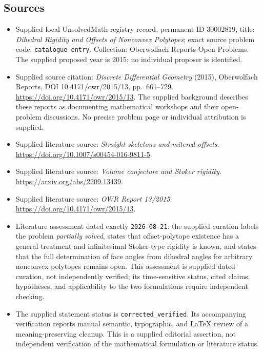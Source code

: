 \documentclass[11pt]{article}
\begin{document}
\subsection{Sources}
\begin{itemize}
\item Supplied local UnsolvedMath registry record, permanent ID \(30002819\), title: \emph{Dihedral Rigidity and Offsets of Nonconvex Polytopes}; exact source problem code: \texttt{catalogue entry}. Collection: Oberwolfach Reports Open Problems. The supplied proposed year is 2015; no individual proposer is identified.
\item Supplied source citation: \emph{Discrete Differential Geometry} (2015), Oberwolfach Reports, DOI 10.4171/owr/2015/13, pp.\ 661--729. \url{https://doi.org/10.4171/owr/2015/13}. The supplied background describes these reports as documenting mathematical workshops and their open-problem discussions. No precise problem page or individual attribution is supplied.
\item Supplied literature source: \emph{Straight skeletons and mitered offsets}. \url{https://doi.org/10.1007/s00454-016-9811-5}.
\item Supplied literature source: \emph{Volume conjecture and Stoker rigidity}. \url{https://arxiv.org/abs/2209.13439}.
\item Supplied literature source: \emph{OWR Report 13/2015}. \url{https://doi.org/10.4171/owr/2015/13}.
\item Literature assessment dated exactly \texttt{2026-08-21}: the supplied curation labels the problem \emph{partially solved}, states that offset-polytope existence has a general treatment and infinitesimal Stoker-type rigidity is known, and states that the full determination of face angles from dihedral angles for arbitrary nonconvex polytopes remains open. This assessment is supplied dated curation, not independently verified; its time-sensitive status, cited claims, hypotheses, and applicability to the two formulations require independent checking.
\item The supplied statement status is \texttt{corrected\_verified}. Its accompanying verification reports manual semantic, typographic, and LaTeX review of a meaning-preserving cleanup. This is a supplied editorial assertion, not independent verification of the mathematical formulation or literature status.
\end{itemize}
\end{document}
